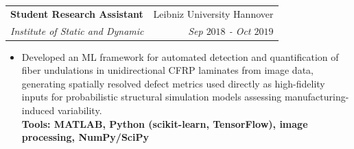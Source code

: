 \documentclass[a4paper,20pt]{article}
\makeatletter
\newcommand{\resumeSubheading}[4]{
  \vspace{-1pt}\item
    \begin{tabular*}{0.97\textwidth}{l@{\extracolsep{\fill}}r}
      \textbf{#1} & #2 \\
      \textit{#3} & \textit{#4} \\
    \end{tabular*}\vspace{-5pt}
}
\newcommand{\resumeItemListStart}{\begin{itemize}}
\newcommand{\resumeItemListEnd}{\end{itemize}\vspace{-5pt}}
\makeatother
\begin{document}
    \vspace{10pt}

\resumeSubheading
    {Student Research Assistant}{Leibniz University Hannover}
    {Institute of Static and Dynamic}{Sep $2018$ - Oct $2019$}
    \resumeItemListStart

    \item Developed an ML framework for automated detection and quantification of fiber undulations in unidirectional CFRP laminates from image data, generating spatially resolved defect metrics used directly as high-fidelity inputs for probabilistic structural simulation models assessing manufacturing-induced variability.
    \\
    \textbf{Tools: MATLAB, Python (scikit-learn, TensorFlow), image processing, NumPy/SciPy}

    \resumeItemListEnd

\renewcommand{\arraystretch}{1.3}
\end{document}
